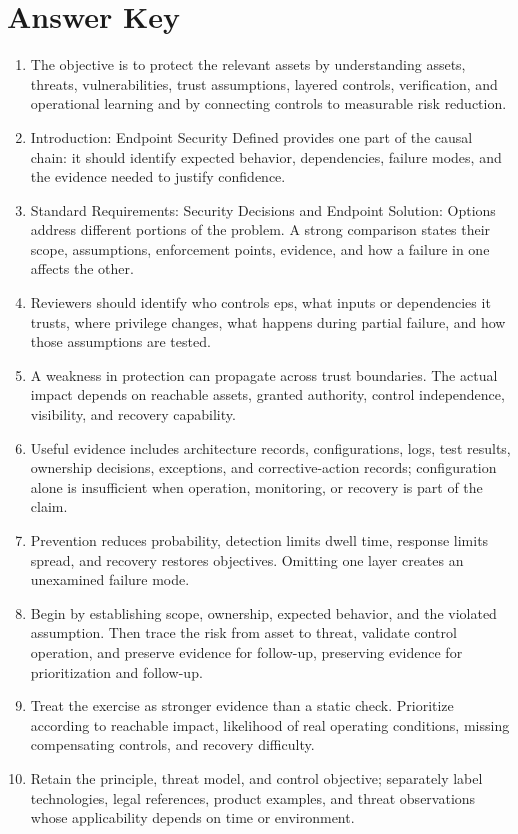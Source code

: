\documentclass[11pt,letterpaper]{article}
\begin{document}
\section*{Answer Key}
\begin{enumerate}
\item The objective is to protect the relevant assets by understanding assets, threats, vulnerabilities, trust assumptions, layered controls, verification, and operational learning and by connecting controls to measurable risk reduction.
\item Introduction: Endpoint Security Defined provides one part of the causal chain: it should identify expected behavior, dependencies, failure modes, and the evidence needed to justify confidence.
\item Standard Requirements: Security Decisions and Endpoint Solution: Options address different portions of the problem. A strong comparison states their scope, assumptions, enforcement points, evidence, and how a failure in one affects the other.
\item Reviewers should identify who controls eps, what inputs or dependencies it trusts, where privilege changes, what happens during partial failure, and how those assumptions are tested.
\item A weakness in protection can propagate across trust boundaries. The actual impact depends on reachable assets, granted authority, control independence, visibility, and recovery capability.
\item Useful evidence includes architecture records, configurations, logs, test results, ownership decisions, exceptions, and corrective-action records; configuration alone is insufficient when operation, monitoring, or recovery is part of the claim.
\item Prevention reduces probability, detection limits dwell time, response limits spread, and recovery restores objectives. Omitting one layer creates an unexamined failure mode.
\item Begin by establishing scope, ownership, expected behavior, and the violated assumption. Then trace the risk from asset to threat, validate control operation, and preserve evidence for follow-up, preserving evidence for prioritization and follow-up.
\item Treat the exercise as stronger evidence than a static check. Prioritize according to reachable impact, likelihood of real operating conditions, missing compensating controls, and recovery difficulty.
\item Retain the principle, threat model, and control objective; separately label technologies, legal references, product examples, and threat observations whose applicability depends on time or environment.
\end{enumerate}
\end{document}
